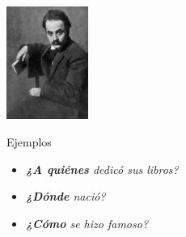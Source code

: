 \begin{question}
\begin{center}
\end{center}

\parbox{300pt}{\raggedright 
\begin{center}
	\includegraphics[width=0.2\textwidth]{NonQuestions/Figure_Slide_22.jpg}
\end{center}	
	
	}\parbox{430pt}{\raggedright \vspace*{20pt}
	
Ejemplos	

\begin{itemize}
	\item \textit{\textbf{¿A quiénes} dedicó sus libros?}
	\item \textit{\textbf{¿Dónde} nació? }
	\item \textit{\textbf{¿Cómo} se hizo famoso?}
\end{itemize}	
	}	
\end{question}